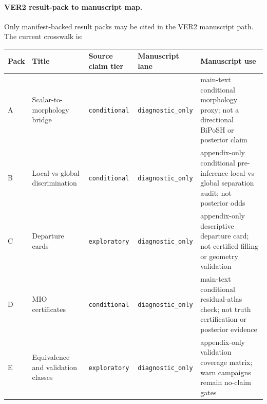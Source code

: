 \paragraph{VER2 result-pack to manuscript map.}
Only manifest-backed result packs may be cited in the VER2 manuscript path.
The current crosswalk is:

\begin{center}
\begin{tabular}{lp{3.1cm}p{2.2cm}p{2.7cm}p{6.4cm}}
\hline
Pack & Title & Source claim tier & Manuscript lane & Manuscript use \\
\hline
A & Scalar-to-morphology bridge & \texttt{conditional} & \texttt{diagnostic\_only} & main-text conditional morphology proxy; not a directional BiPoSH or posterior claim \\
B & Local-vs-global discrimination & \texttt{conditional} & \texttt{diagnostic\_only} & appendix-only conditional pre-inference local-vs-global separation audit; not posterior odds \\
C & Departure cards & \texttt{exploratory} & \texttt{diagnostic\_only} & appendix-only descriptive departure card; not certified filling or geometry validation \\
D & MIO certificates & \texttt{conditional} & \texttt{diagnostic\_only} & main-text conditional residual-atlas check; not truth certification or posterior evidence \\
E & Equivalence and validation classes & \texttt{exploratory} & \texttt{diagnostic\_only} & appendix-only validation coverage matrix; warn campaigns remain no-claim gates \\
\hline
\end{tabular}
\end{center}
